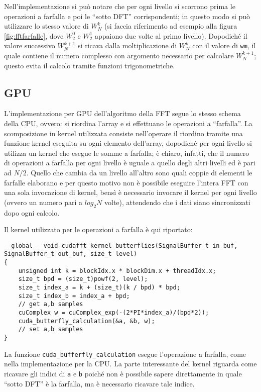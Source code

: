 Nell'implementazione si può notare che per ogni livello si scorrono prima le operazioni a farfalla e poi le ``sotto DFT'' corrispondenti; in questo modo si può utilizzare lo stesso valore di $W_N^k$ (si faccia riferimento ad esempio alla figura \ref{fig:fftfarfalle}, dove $W_2^0$ e $W_2^1$ appaiono due volte al primo livello). Dopodiché il valore successivo $W_N^{k+1}$ si ricava dalla moltiplicazione di $W_N^k$ con il valore di \lstinline{wm}, il quale contiene il numero complesso con argomento necessario per calcolare $W_N^{k+1}$; questo evita il calcolo tramite funzioni trigonometriche.

\subsection{GPU}

L'implementazione per GPU dell'algoritmo della FFT segue lo stesso schema della CPU, ovvero: si riordina l'array e si effettuano le operazioni a ``farfalla''. La scomposizione in kernel utilizzata consiste nell'operare il riordino tramite una funzione kernel eseguita su ogni elemento dell'array, dopodiché per ogni livello si utilizza un kernel che esegue le somme a farfalla; è chiaro, infatti, che il numero di operazioni a farfalla per ogni livello è uguale a quello degli altri livelli ed è pari ad $N/2$. Quello che cambia da un livello all'altro sono quali coppie di elementi le farfalle elaborano e per questo motivo non è possibile eseguire l'intera FFT con una sola invocazione di kernel, bensì è necessario invocare il kernel per ogni livello (ovvero un numero pari a $log_2 N$ volte), attendendo che i dati siano sincronizzati dopo ogni calcolo.

Il kernel utilizzato per le operazioni a farfalla è qui riportato:

\begin{lstlisting}
__global__ void cudafft_kernel_butterflies(SignalBuffer_t in_buf, SignalBuffer_t out_buf, size_t level)
{
    unsigned int k = blockIdx.x * blockDim.x + threadIdx.x;
    size_t bpd = (size_t)powf(2, level);
    size_t index_a = k + (size_t)(k / bpd) * bpd;
    size_t index_b = index_a + bpd;
    // get a,b samples
    cuComplex w = cuComplex_exp(-(2*PI*index_a)/(bpd*2));
    cuda_butterfly_calculation(&a, &b, w);
    // set a,b samples
}
\end{lstlisting}

La funzione \lstinline{cuda_bufferfly_calculation} esegue l'operazione a farfalla, come nella implementazione per la CPU. La parte interessante del kernel riguarda come ricavare gli indici di \lstinline{a} e \lstinline{b} poiché non è possibile sapere direttamente in quale ``sotto DFT'' è la farfalla, ma è necessario ricavare tale indice.

